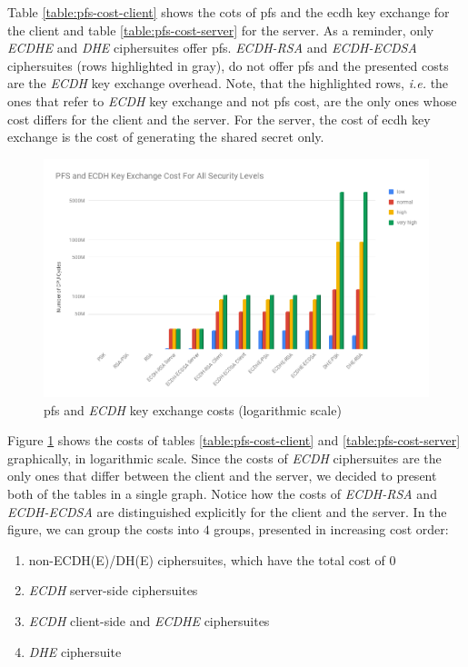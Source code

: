 \documentclass{llncs}
\begin{document}
Table \ref{table:pfs-cost-client} shows the cots of \gls{pfs} and the \gls{ecdh} key exchange for the client and table \ref{table:pfs-cost-server}
for the server. As a reminder, only \textit{ECDHE} and \textit{DHE} ciphersuites offer \gls{pfs}. \textit{ECDH-RSA} and \textit{ECDH-ECDSA}
ciphersuites (rows highlighted in gray), do not offer \gls{pfs} and the presented costs are the \textit{ECDH} key exchange overhead. Note, that the
highlighted rows, \textit{i.e.} the ones that refer to \textit{ECDH} key exchange and not \gls{pfs} cost, are the only ones whose cost differs for
the client and the server. For the server, the cost of \gls{ecdh} key exchange is the cost of generating the shared secret only.

\begin{figure}
  \centering
  \includegraphics[width=1.0\textwidth]{img/pfs_cost_all_sls.png}
  \centering \caption{\label{fig:pfs-cost-all-sls} \gls{pfs} and \textit{ECDH} key exchange costs (logarithmic scale)}
\end{figure}

Figure \ref{fig:pfs-cost-all-sls} shows the costs of tables \ref{table:pfs-cost-client} and \ref{table:pfs-cost-server} graphically, in logarithmic scale.
 Since the costs
of \textit{ECDH} ciphersuites are the only ones that differ between the client and the server, we decided to present both of the tables in a
single graph. Notice how the costs of \textit{ECDH-RSA} and \textit{ECDH-ECDSA} are distinguished explicitly for the client and the server.
In the figure, we can group the costs into $4$ groups, presented in increasing cost order:

\begin{enumerate}
  \item non-ECDH(E)/DH(E) ciphersuites, which have the total cost of $0$
  \item \textit{ECDH} server-side ciphersuites
  \item \textit{ECDH} client-side and \textit{ECDHE} ciphersuites
  \item \textit{DHE} ciphersuite
\end{enumerate}
\end{document}
